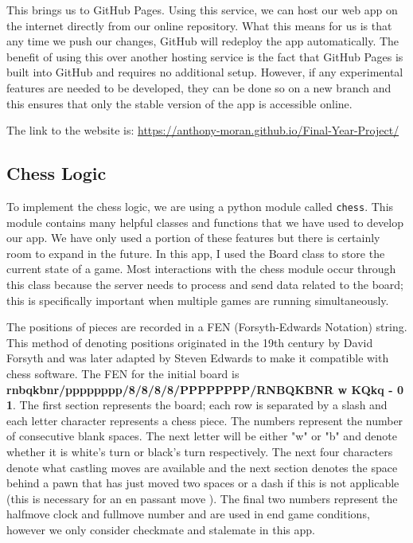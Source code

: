 This brings us to GitHub Pages. Using this service, we can host our web app on the internet directly from our online repository. What this means for us is that any time we push our changes, GitHub will redeploy the app automatically. The benefit of using this over another hosting service is the fact that GitHub Pages is built into GitHub and requires no additional setup. However, if any experimental features are needed to be developed, they can be done so on a new branch and this ensures that only the stable version of the app is accessible online.

The link to the website is: \url{https://anthony-moran.github.io/Final-Year-Project/}

\subsection{Chess Logic}

To implement the chess logic, we are using a python module called \lstinline{chess}. This module contains many helpful classes and functions that we have used to develop our app. We have only used a portion of these features but there is certainly room to expand in the future. In this app, I used the Board class to store the current state of a game. Most interactions with the chess module occur through this class because the server needs to process and send data related to the board; this is specifically important when multiple games are running simultaneously.

The positions of pieces are recorded in a FEN (Forsyth-Edwards Notation) \cite{PGNStandard} string. This method of denoting positions originated in the 19th century by David Forsyth and was later adapted by Steven Edwards to make it compatible with chess software. The FEN for the initial board is \textbf{rnbqkbnr/pppppppp/8/8/8/8/PPPPPPPP/RNBQKBNR w KQkq - 0 1}. The first section represents the board; each row is separated by a slash and each letter character represents a chess piece. The numbers represent the number of consecutive blank spaces. The next letter will be either "w" or "b" and denote whether it is white's turn or black's turn respectively. The next four characters denote what castling moves are available and the next section denotes the space behind a pawn that has just moved two spaces or a dash if this is not applicable (this is necessary for an en passant move \cite{EnPassant}). The final two numbers represent the halfmove clock and fullmove number and are used in end game conditions, however we only consider checkmate and stalemate in this app.

